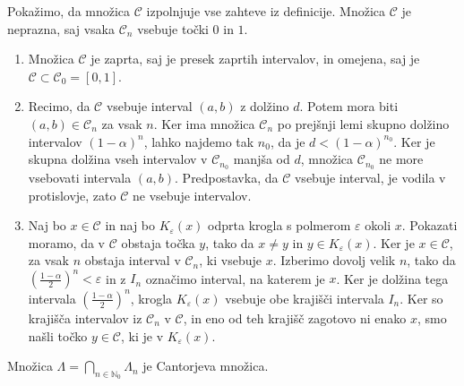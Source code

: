 \documentclass{isrmdelo}
\newcommand{\N}{\mathbb N}
\newcommand{\cantorset}{\mathcal{C}}
\begin{document}
\begin{dokaz}
Pokažimo, da množica $\cantorset$ izpolnjuje vse zahteve iz definicije. Množica $\cantorset$ je neprazna, saj vsaka $\cantorset_n$ vsebuje točki $0$ in $1$. 
\begin{enumerate}
    \item Množica $\cantorset$ je zaprta, saj je presek zaprtih intervalov, in omejena, saj je $\cantorset \subset \cantorset_0 = [0, 1]$.
    \item Recimo, da $\cantorset$ vsebuje interval $(a, b)$ z dolžino $d$. Potem mora biti $(a,b) \in \cantorset_n$ za vsak $n$. Ker ima množica $\cantorset_n$ po prejšnji lemi skupno dolžino intervalov $(1-\alpha)^n$, lahko najdemo tak $n_0$, da je $d < (1-\alpha)^{n_0}$. Ker je skupna dolžina vseh intervalov v $\cantorset_{n_0}$ manjša od $d$, množica $\cantorset_{n_0}$ ne more vsebovati intervala $(a,b)$. Predpostavka, da $\cantorset$ vsebuje interval, je vodila v protislovje, zato $\cantorset$ ne vsebuje intervalov.
    \item Naj bo $x \in \cantorset$ in naj bo $K_\varepsilon(x)$ odprta krogla s polmerom $\varepsilon$ okoli $x$. Pokazati moramo, da v $\cantorset$ obstaja točka $y$, tako da $x \neq y$ in $y \in K_\varepsilon(x)$. Ker je $x \in \cantorset$, za vsak $n$ obstaja interval v $\cantorset_n$, ki vsebuje $x$. Izberimo dovolj velik $n$, tako da $(\frac{1-\alpha}{2})^n < \varepsilon$ in z $I_n$ označimo interval, na katerem je $x$. Ker je dolžina tega intervala $(\frac{1-\alpha}{2})^n$, krogla $K_\varepsilon(x)$ vsebuje obe krajišči intervala $I_n$. Ker so krajišča intervalov iz $\cantorset_n$ v $\cantorset$, in eno od teh krajišč zagotovo ni enako $x$, smo našli točko $y \in \cantorset$, ki je v $K_\varepsilon(x)$. \qedhere
\end{enumerate}
\end{dokaz}

\medskip

\begin{trditev}
Množica $\Lambda = \bigcap_{n \in \N_0} \Lambda_n$ je Cantorjeva množica.
\end{trditev}
\end{document}
